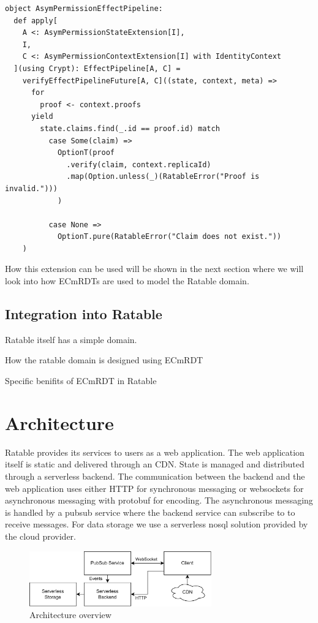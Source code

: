 \documentclass[
	ngerman,
	ruledheaders=section,   %
	class=report,		    %
	thesis={type=bachelor}, %
	accentcolor=9c,			%
	custommargins=true,    %
	marginpar=false,        %
	parskip=half-,          %
	fontsize=11pt,          %
]{tudapub}
\begin{document}
\begin{lstlisting}
object AsymPermissionEffectPipeline:
  def apply[
    A <: AsymPermissionStateExtension[I], 
    I, 
    C <: AsymPermissionContextExtension[I] with IdentityContext
  ](using Crypt): EffectPipeline[A, C] =
    verifyEffectPipelineFuture[A, C]((state, context, meta) =>
      for
        proof <- context.proofs
      yield
        state.claims.find(_.id == proof.id) match
          case Some(claim) => 
            OptionT(proof
              .verify(claim, context.replicaId)
              .map(Option.unless(_)(RatableError("Proof is invalid.")))
            )

          case None => 
            OptionT.pure(RatableError("Claim does not exist."))
    )
\end{lstlisting}

How this extension can be used will be shown in the next section where we will look into how ECmRDTs are used to model the Ratable domain.

\section{Integration into Ratable}
Ratable itself has a simple domain.

How the ratable domain is designed using ECmRDT

Specific benifits of ECmRDT in Ratable

\chapter{Architecture}


Ratable provides its services to users as a web application. The web application itself is static and delivered through an CDN. State is managed and distributed through a serverless backend. The communication between the backend and the web application uses either HTTP for synchronous messaging or websockets for asynchronous messaging with protobuf for encoding. The asynchronous messaging is handled by a pubsub service where the backend service can subscribe to to receive messages. For data storage we use a serverless nosql solution provided by the cloud provider.

\begin{figure}[h]
  \centering
  \includegraphics[width=0.7\textwidth]{architecture_services.png}
  \caption{Architecture overview}
\end{figure}
\end{document}
